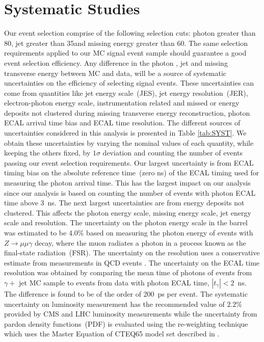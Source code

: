 \section{Systematic Studies}
Our event selection comprise of the following selection cuts: photon \pt greater than 80\GeVc, jet \pt greater than 35\GeVc and missing energy greater than 60\GeV. The same selection requirements applied to our MC signal event sample should guarantee a good event selection efficiency. Any difference in the photon \pt, jet \pt and missing transverse energy between MC and data, will be a source of systematic uncertainties on the efficiency of selecting signal events. These uncertainties can come from quantities like jet energy scale~(JES), jet energy resolution~(JER), electron-photon energy scale, instrumentation related and missed or energy deposits not clustered during missing transverse energy reconstruction, photon ECAL arrival time bias and ECAL time resolution. The different sources of uncertainties considered in this analysis is presented in Table \ref{tab:SYST}. We obtain these uncertainties by varying the nominal values of each quantity, while keeping the others fixed, by $1\sigma$ deviation and counting the number of events passing our event selection requirements. Our largest uncertainty is from ECAL timing bias on the absolute reference time~(zero ns) of the ECAL timing used for measuring the photon arrival time. This has the largest impact on our analysis since our analysis is based on counting the number of events with photon ECAL time above $3$~ns. The next largest uncertainties are from energy deposits not clustered. This affects the photon energy scale, missing energy scale,  jet energy scale and resolution.
\newline
The uncertainty on the photon energy scale in the barrel was estimated to be 4.0\%  based on measuring the photon energy of events with $Z\rightarrow \mu\mu\gamma$ decay, where the muon radiates a photon in a process known as the final-state radiation~(FSR)\cite{PES}.  
\newline
The uncertainty on the \MET resolution uses a conservative estimate from \MET measurements in QCD events \cite{METRES}. 
\newline
The uncertainty on the ECAL time resolution was obtained by comparing the mean time of photons of events from $\gamma +$ jet MC sample to events from data with photon ECAL time, $|t_{\gamma}| < 2$~ns. The difference is found to be of the order of 200~ps per event. 
\newline
The systematic uncertainty on luminosity measurement has the recommended value of $2.2$\% provided by CMS and LHC luminosity measurements while the uncertainty from pardon density functions~(PDF) is evaluated using the re-weighting technique which uses the Master Equation of CTEQ65 model set described in \cite{PDF}.
